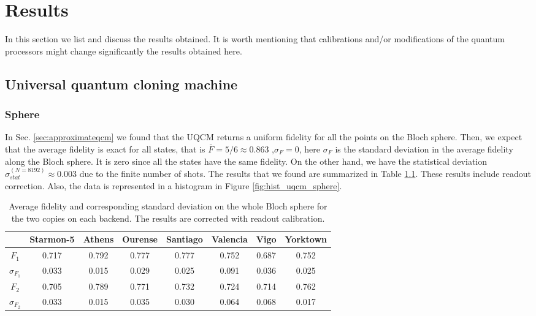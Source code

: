 \chapter{Results}
\label{sec:results}

In this section we list and discuss the results obtained.
It is worth mentioning that calibrations and/or modifications of the quantum processors might change significantly the results obtained here.

\section{Universal quantum cloning machine}
    
\subsection{Sphere}

In Sec. \ref{sec:approximateqcm} we found that the UQCM returns a uniform fidelity for all the points on the Bloch sphere. Then, we expect that the average fidelity is exact for all states, that is $\bar{F} = 5/6 \approx 0.863$ ,$\sigma_{F} = 0$, here $\sigma_F$ is the standard deviation in the average fidelity along the Bloch sphere. It is zero since all the states have the same fidelity. On the other hand, we have the statistical deviation $\sigma_{stat}^{(N=8192)}\approx 0.003$ due to the finite number of shots. The results that we found are summarized in Table \ref{tab:uqcm_results_full_sphere}. These results include readout correction. Also, the data is represented in a histogram in Figure \ref{fig:hist_uqcm_sphere}. 

\begin{table}[H]
    \centering
    \begin{tabular}{|c|c|c|c|c|c|c|c|}
    \hline
    \textbf{} & \textbf{Starmon-5} & \textbf{Athens} & \textbf{Ourense} & \textbf{Santiago} & \textbf{Valencia} & \textbf{Vigo} & \textbf{Yorktown} \\ \hline
    $F_1$              & 0.717 & 0.792 & 0.777 & 0.777 & 0.752 & 0.687 & 0.752\\ \hline
    $\sigma_{F_1}$     & 0.033 & 0.015 & 0.029 & 0.025 & 0.091 & 0.036 & 0.025 \\ \hline
    $F_2$              & 0.705 & 0.789 & 0.771 & 0.732 & 0.724 & 0.714 & 0.762 \\ \hline
    $\sigma_{F_2}$     & 0.033 & 0.015 & 0.035 & 0.030 & 0.064 & 0.068 & 0.017 \\ \hline
    \end{tabular}
    \caption{Average fidelity and corresponding standard deviation on the whole Bloch sphere for the two copies on each backend. The results are corrected with readout calibration.}\label{tab:uqcm_results_full_sphere}
\end{table}

